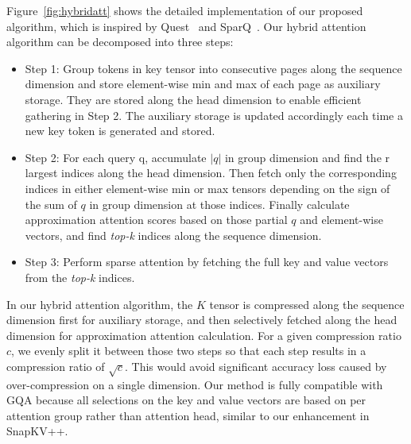 Figure~\ref{fig:hybridatt} shows the detailed implementation of our proposed algorithm, which is inspired by Quest~\cite{quest2024} and SparQ~\cite{sparq2024}. Our hybrid attention algorithm can be decomposed into three steps:
 \begin{itemize} 
     \item Step 1: Group tokens in key tensor into consecutive pages along the sequence dimension and store element-wise min and max of each page as auxiliary storage. They are stored along the head dimension to enable efficient gathering in Step 2. The auxiliary storage is updated accordingly each time a new key token is generated and stored. 
     \item Step 2: For each query q, accumulate $|q|$ in group dimension and find the r largest indices along the head dimension.  Then fetch only the corresponding indices in either element-wise min or max tensors depending on the sign of the sum of $q$ in group dimension at those indices. Finally calculate approximation attention scores based on those partial $q$ and element-wise vectors, and find \textit{top-k} indices along the sequence dimension. 
     \item Step 3: Perform sparse attention by fetching the full key and value vectors from the \textit{top-k} indices.
 \end{itemize}
In our hybrid attention algorithm, the $K$ tensor is compressed along the sequence dimension first for auxiliary storage, and then selectively fetched along the head dimension for approximation attention calculation. For a given compression ratio $c$, we evenly split it between those two steps so that each step results in a compression ratio of $\sqrt{c}$. This would avoid significant accuracy loss caused by over-compression on a single dimension. Our method is fully compatible with GQA because all selections on the key and value vectors are based on per attention group rather than attention head, similar to our enhancement in SnapKV++. 


\begin{table}[!t]
\caption{Normalized KV cache storage (including auxiliary data) and traffic comparison between \rocketkv and other methods.}
\centering
{}
\label{tab:cost_analysis}

\end{table}

